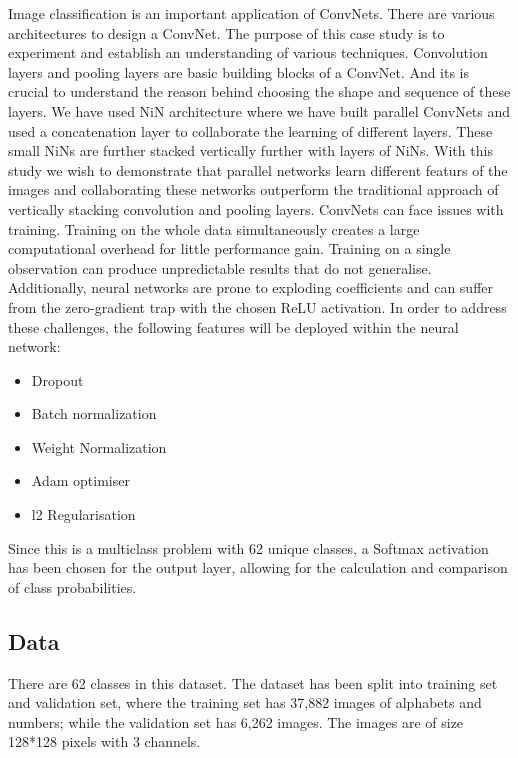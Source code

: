 \documentclass[fleqn,10pt]{SelfArx} %
\begin{document}
Image classification is an important application of ConvNets. There are various architectures to design a ConvNet. The purpose of this case study is to experiment and establish an understanding of various techniques. Convolution layers and pooling layers are basic building blocks of a ConvNet. And its is crucial to understand the reason behind choosing the shape and sequence of these layers.
\newline
We have used NiN architecture where we have built parallel ConvNets and used a concatenation layer to collaborate the learning of different layers. These small NiNs are further stacked vertically further with layers of NiNs. With this study we wish to demonstrate that parallel networks learn different featurs of the images and collaborating these networks outperform the traditional approach of vertically stacking convolution and pooling layers.
\newline
ConvNets can face issues with training. Training on the whole data simultaneously creates a large computational overhead for little performance gain. Training on a single observation can produce unpredictable results that do not generalise. Additionally, neural networks are prone to exploding coefficients and can suffer from the zero-gradient trap with the chosen ReLU activation. In order to address these challenges, the following features will be deployed within the neural network:
\begin{itemize}
\itemsep0em
  \item Dropout
  \item Batch normalization
  \item Weight Normalization
  \item Adam optimiser
  \item l2 Regularisation
\end{itemize}
Since this is a multiclass problem with 62 unique classes, a Softmax activation has been chosen for the output layer, allowing for the calculation and comparison of class probabilities.

\subsection{Data}
There are 62 classes in this dataset. The dataset has been split into training set and validation set, where the training set has 37,882 images of alphabets and numbers; while the validation set has 6,262 images. The images are of size 128*128 pixels with 3 channels.
\end{document}
